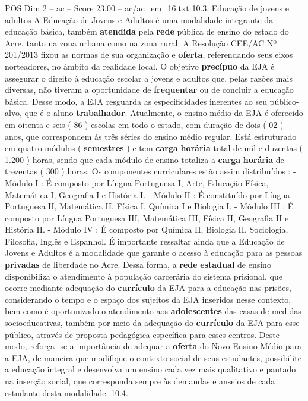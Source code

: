\begin{textsample}{POS Dim 2 – ac – Score 23.00 – ac/ac\_em\_16.txt}  \label{ex:f2_pos_169}
10.3.
Educação de jovens e adultos A Educação de Jovens e Adultos é uma modalidade integrante da educação básica, também \textbf{atendida} pela \textbf{rede} pública de ensino do estado do Acre, tanto na zona urbana como na zona rural.
A Resolução CEE/AC Nº 201/2013 fixou as normas de sua organização e \textbf{oferta}, referendando seus eixos norteadores, no âmbito da realidade local.
O objetivo \textbf{precípuo} da EJA é assegurar o direito à educação escolar a jovens e adultos que, pelas razões mais diversas, não tiveram a oportunidade de \textbf{frequentar} ou de concluir a educação básica.
Desse modo, a EJA resguarda as especificidades inerentes ao seu público-alvo, que é o aluno \textbf{trabalhador}.
Atualmente, o ensino médio da EJA é oferecido em oitenta e seis ( 86 ) escolas em todo o estado, com duração de dois ( 02 ) anos, que correspondem às três séries do ensino médio regular.
Está estruturado em quatro módulos ( \textbf{semestres} ) e tem \textbf{carga} \textbf{horária} total de mil e duzentas ( 1.200 ) horas, sendo que cada módulo de ensino totaliza a \textbf{carga} \textbf{horária} de trezentas ( 300 ) horas.
Os componentes curriculares estão assim distribuídos : - Módulo I : É composto por Língua Portuguesa I, Arte, Educação Física, Matemática I, Geografia I e História I. - Módulo II : É constituído por Língua Portuguesa II, Matemática II, Física I, Química I e Biologia I. - Módulo III : É composto por Língua Portuguesa III, Matemática III, Física II, Geografia II e História II. - Módulo IV : É composto por Química II, Biologia II, Sociologia, Filosofia, Inglês e Espanhol.
É importante ressaltar ainda que a Educação de Jovens e Adultos é a modalidade que garante o acesso à educação para as pessoas \textbf{privadas} de liberdade no Acre.
Dessa forma, a \textbf{rede} \textbf{estadual} de ensino disponibiliza o atendimento à população carcerária do sistema prisional, que ocorre mediante adequação do \textbf{currículo} da EJA para a educação nas prisões, considerando o tempo e o espaço dos sujeitos da EJA inseridos nesse contexto, bem como é oportunizado o atendimento aos \textbf{adolescentes} das casas de medidas socioeducativas, também por meio da adequação do \textbf{currículo} da EJA para esse público, através de proposta pedagógica específica para esses centros.
Deste modo, reforça -se a importância de adequar a \textbf{oferta} do Novo Ensino Médio para a EJA, de maneira que modifique o contexto social de seus estudantes, possibilite a educação integral e desenvolva um ensino cada vez mais qualitativo e pautado na inserção social, que corresponda sempre às demandas e anseios de cada estudante desta modalidade. 10.4.

\end{textsample}
